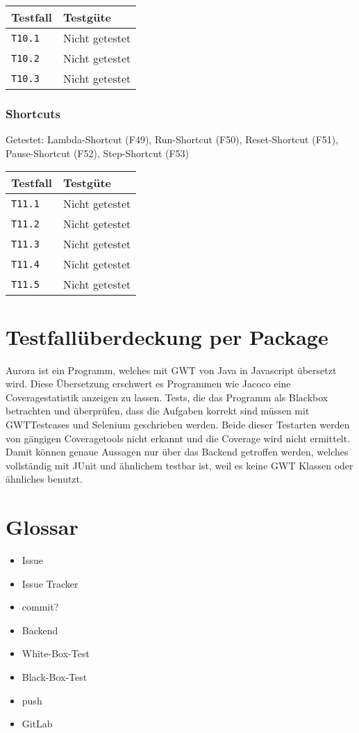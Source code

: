 \documentclass[parskip=full,11pt,twoside]{scrartcl}
\newcommand{\testline}[2]{
    \texttt{#1} & 
    \ifthenelse{\equal{#2}{Nicht getestet}}
        {\cellcolor{red!20}}
        {}
    \ifthenelse{\equal{#2}{Manuell getestet}}
        {\cellcolor{orange!20}}
        {}
    \ifthenelse{\equal{#2}{Automatisiert getestet}}
        {\cellcolor{green!20}}
        {}
    #2 \\ \hline
}
\begin{document}
    \label{shortcuts}
    \begin{center}
        \begin{tabular}{ p{9cm} p{4cm}}
            Testfall & Testgüte \\ \hline
            \testline{T10.1}{Nicht getestet}
            \testline{T10.2}{Nicht getestet}
            \testline{T10.3}{Nicht getestet}
        \end{tabular}
    \end{center}

\subsubsection{Shortcuts}
    Getestet:
    Lambda-Shortcut (F49),
    Run-Shortcut (F50),
    Reset-Shortcut (F51),
    Pause-Shortcut (F52),
    Step-Shortcut (F53)

    \label{shortcuts}
    \begin{center}
        \begin{tabular}{ p{9cm} p{4cm}}
            Testfall & Testgüte \\ \hline
            \testline{T11.1}{Nicht getestet}
            \testline{T11.2}{Nicht getestet}
            \testline{T11.3}{Nicht getestet}
            \testline{T11.4}{Nicht getestet}
            \testline{T11.5}{Nicht getestet}
        \end{tabular}
    \end{center}

\section{Testfallüberdeckung per Package}
    Aurora ist ein Programm, welches mit GWT von Java in Javascript übersetzt wird.
    Diese Übersetzung erschwert es Programmen wie Jacoco eine Coveragestatistik anzeigen zu lassen.
    Tests, die das Programm als Blackbox betrachten und überprüfen, dass die Aufgaben korrekt sind müssen
    mit GWTTestcases und Selenium geschrieben werden.
    Beide dieser Testarten werden von gängigen Coveragetools nicht erkannt und die Coverage wird nicht
    ermittelt.
    Damit können genaue Aussagen nur über das Backend getroffen werden, welches vollständig mit JUnit und ähnlichem
    testbar ist, weil es keine GWT Klassen oder ähnliches benutzt.
    

\section{Glossar}
\begin{itemize}
    \item Issue
    \item Issue Tracker
    \item commit?
    \item Backend
    \item White-Box-Test
    \item Black-Box-Test
    \item push
    \item GitLab
\end{itemize}
\end{document}
